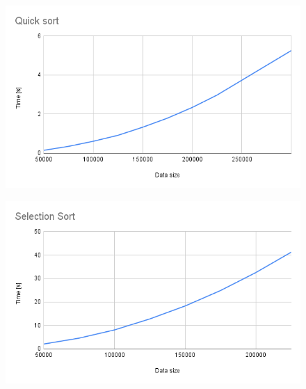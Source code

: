 \begin{minipage}{0.5\textwidth}
    \begin{figure}[H]
        \centering
        \includegraphics[width=1.0\textwidth]{content/Quick_sort.png}
        \label{fig:Quick_sort}
    \end{figure}
\end{minipage}
\begin{minipage}{0.5\textwidth}
    \begin{figure}[H]
        \centering
        \includegraphics[width=1.0\textwidth]{content/Selection_Sort.png}
        \label{fig:Selection_Sort}
    \end{figure}
\end{minipage}